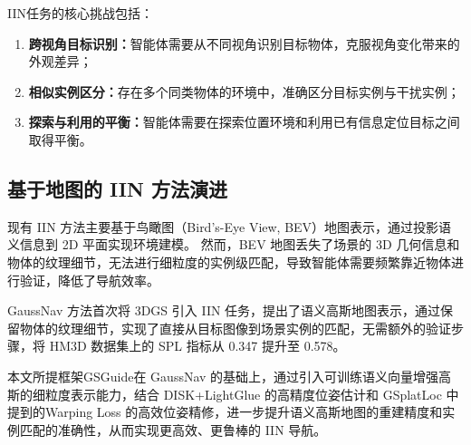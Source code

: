 IIN任务的核心挑战包括：
\begin{enumerate}
    \item \textbf{跨视角目标识别：}智能体需要从不同视角识别目标物体，克服视角变化带来的外观差异；
    \item \textbf{相似实例区分：}存在多个同类物体的环境中，准确区分目标实例与干扰实例；
    \item \textbf{探索与利用的平衡：}智能体需要在探索位置环境和利用已有信息定位目标之间取得平衡。
\end{enumerate}

\subsection{基于地图的 IIN 方法演进}
现有 IIN 方法主要基于鸟瞰图（Bird's-Eye View, BEV）\cite{krantz2023navigating,lei2024instance,chaplot2020object}地图表示，通过投影语义信息到 2D 平面实现环境建模。
然而，BEV 地图丢失了场景的 3D 几何信息和物体的纹理细节，无法进行细粒度的实例级匹配，导致智能体需要频繁靠近物体进行验证，降低了导航效率。

GaussNav\cite{gaussnav} 方法首次将 3DGS 引入 IIN\cite{krantz2022instance} 任务，提出了语义高斯地图表示，通过保留物体的纹理细节，实现了直接从目标图像到场景实例的匹配，无需额外的验证步骤，将 HM3D 数据集上的 SPL 指标从 0.347 提升至 0.578。

本文所提框架GSGuide在 GaussNav\cite{gaussnav} 的基础上，通过引入可训练语义向量增强高斯的细粒度表示能力，结合 DISK+LightGlue\cite{disk,lightglue} 的高精度位姿估计和 GSplatLoc\cite{gsplatloc} 中提到的Warping Loss 的高效位姿精修，进一步提升语义高斯地图的重建精度和实例匹配的准确性，从而实现更高效、更鲁棒的 IIN 导航。
